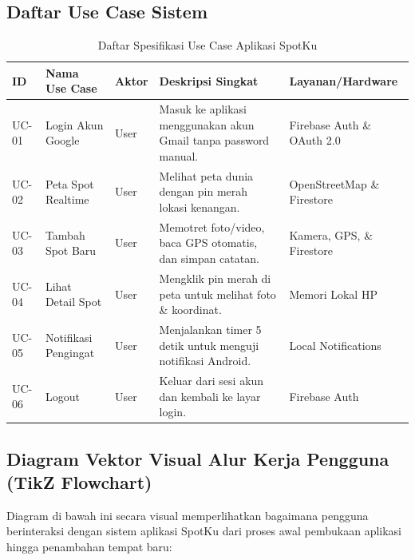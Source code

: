 \documentclass[12pt,a4paper]{article}
\begin{document}
\subsection{Daftar Use Case Sistem}

\begin{table}[h!]
\centering
\small
\begin{tabularx}{\textwidth}{l l l X l}
\toprule
\textbf{ID} & \textbf{Nama Use Case} & \textbf{Aktor} & \textbf{Deskripsi Singkat} & \textbf{Layanan/Hardware} \\
\midrule
UC-01 & Login Akun Google & User & Masuk ke aplikasi menggunakan akun Gmail tanpa password manual. & Firebase Auth \& OAuth 2.0 \\
UC-02 & Peta Spot Realtime & User & Melihat peta dunia dengan pin merah lokasi kenangan. & OpenStreetMap \& Firestore \\
UC-03 & Tambah Spot Baru & User & Memotret foto/video, baca GPS otomatis, dan simpan catatan. & Kamera, GPS, \& Firestore \\
UC-04 & Lihat Detail Spot & User & Mengklik pin merah di peta untuk melihat foto \& koordinat. & Memori Lokal HP \\
UC-05 & Notifikasi Pengingat & User & Menjalankan timer 5 detik untuk menguji notifikasi Android. & Local Notifications \\
UC-06 & Logout & User & Keluar dari sesi akun dan kembali ke layar login. & Firebase Auth \\
\bottomrule
\end{tabularx}
\caption{Daftar Spesifikasi Use Case Aplikasi SpotKu}
\end{table}

\newpage
\subsection{Diagram Vektor Visual Alur Kerja Pengguna (TikZ Flowchart)}

Diagram di bawah ini secara visual memperlihatkan bagaimana pengguna berinteraksi dengan sistem aplikasi SpotKu dari proses awal pembukaan aplikasi hingga penambahan tempat baru:
\end{document}
